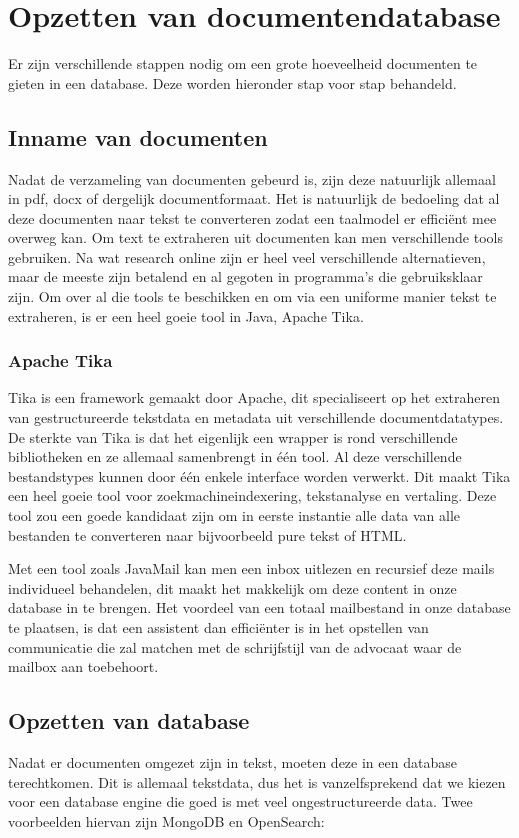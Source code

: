\chapter{Opzetten van documentendatabase}
Er zijn verschillende stappen nodig om een grote hoeveelheid documenten te gieten in een database. 
Deze worden hieronder stap voor stap behandeld. 

\section{Inname van documenten}
Nadat de verzameling van documenten gebeurd is, zijn deze natuurlijk allemaal in pdf, docx of dergelijk documentformaat. 
Het is natuurlijk de bedoeling dat al deze documenten naar tekst te converteren zodat een taalmodel er efficiënt mee overweg kan. 
Om text te extraheren uit documenten kan men verschillende tools gebruiken. 
Na wat research online zijn er heel veel verschillende alternatieven, maar de meeste zijn betalend en al gegoten in programma's die gebruiksklaar zijn. 
Om over al die tools te beschikken en om via een uniforme manier tekst te extraheren, is er een heel goeie tool in Java, Apache Tika. 

\subsection{Apache Tika}
Tika is een framework gemaakt door Apache, dit specialiseert op het extraheren van gestructureerde tekstdata en metadata uit verschillende documentdatatypes. 
De sterkte van Tika is dat het eigenlijk een wrapper is rond verschillende bibliotheken en ze allemaal samenbrengt in één tool.
Al deze verschillende bestandstypes kunnen door één enkele interface worden verwerkt. 
Dit maakt Tika een heel goeie tool voor zoekmachineindexering, tekstanalyse en vertaling.
Deze tool zou een goede kandidaat zijn om in eerste instantie alle data van alle bestanden te converteren naar bijvoorbeeld pure tekst of HTML. 

Met een tool zoals JavaMail kan men een inbox uitlezen en recursief deze mails individueel behandelen, dit maakt het makkelijk om deze content in onze database in te brengen. 
Het voordeel van een totaal mailbestand in onze database te plaatsen, 
is dat een assistent dan efficiënter is in het opstellen van communicatie die zal matchen met de schrijfstijl van de advocaat waar de mailbox aan toebehoort. 

\section{Opzetten van database}
Nadat er documenten omgezet zijn in tekst, moeten deze in een database terechtkomen. 
Dit is allemaal tekstdata, dus het is vanzelfsprekend dat we kiezen voor een database engine die goed is met veel ongestructureerde data. 
Twee voorbeelden hiervan zijn MongoDB en OpenSearch:

